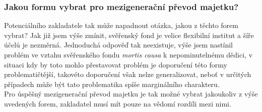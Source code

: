 \documentclass{article}
\begin{document}





\subsubsection{Jakou formu vybrat pro mezigenerační převod majetku?}

Potenciálního zakladatele tak může napadnout otázka, jakou z těchto forem vybrat? Jak již jsem výše zmínit, svěřenský fond je velice flexibilní institut a šíře účelů je nezměrná. Jednoduchá odpověď tak neexistuje, výše jsem nastínil problém ve vztahu svěřenského fondu \textit{mortis causa} k nepominutelnému dědici, v situaci kdy by toto mohlo přestavovat problém je doporučení této formy problematičtější, takovéto doporučení však nelze generalizovat, neboť v určitých případech může být tato problematika spíše marginálního charakteru.\\

Pro úspěšný mezigenerační převod majetku je tak možné vybrat jakoukoliv z výše uvedených forem, zakladatel musí mít pouze na vědomí rozdíli mezi nimi.\\

\end{document}
